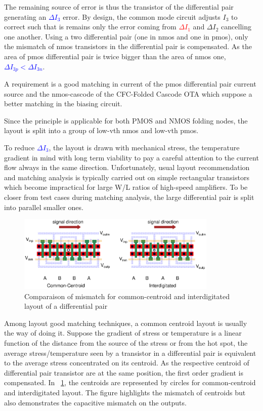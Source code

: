 The remaining source of error is thus the transistor of the differential pair generating an \textcolor{blue}{\(\Delta I_3\)} error. By design, the common mode circuit adjusts \(I_3\) to correct such that is remains only the error coming from \textcolor{red}{\(\Delta I_1\)} and \textcolor{Xgreen}{\(\Delta I_2\)} cancelling one another. Using a two differential pair (one in nmos and one in pmos), only the mismatch of nmos transistors in the differential pair is compensated. As the area of pmos differential pair is twice bigger than the area of nmos one, \textcolor{blue}{\(\Delta I_{3p} < \Delta I_{3n}\)}.

A requirement is a good matching in current of the pmos differential pair current source and the nmos-cascode of the CFC-Folded Cascode OTA which suppose a better matching in the biasing circuit.

Since the principle is applicable for both PMOS and NMOS folding nodes, the layout is split into a group of low-vth nmos and low-vth pmos.

To reduce \textcolor{blue}{\(\Delta I_3\)}, the layout is drawn with mechanical stress, the temperature gradient in mind with long term viability to pay a careful attention to the current flow always in the same direction. Unfortunately, usual layout recommendation and matching analysis is typically carried out on simple rectangular transistors which become impractical for large W/L ratios of high-speed amplifiers. To be closer from test cases during matching analysis, the large differential pair is split into parallel smaller ones.

\begin{figure}[htp]
    \centering
    \includegraphics[width=0.85\textwidth]{Chapter7/Figs/common-centroi-vs-interdigitated.ps}
    \caption{Comparaison of mismatch for common-centroid and interdigitated layout of a differential pair}
    \label{fig:common-centroid-vs-interdigitated}
\end{figure}

Among layout good matching techniques, a common centroid layout is usually the way of doing it. Suppose the gradient of stress or temperature is a linear function of the distance from the source of the stress or from the hot spot, the average stress/temperature seen by a transistor in a differential pair is equivalent to the average stress concentrated on its centroid. As the respective centroid of differential pair transistor are at the same position, the first order gradient is compensated. In \figurename~\ref{fig:common-centroid-vs-interdigitated}, the centroids are represented by circles for common-centroid and interdigitated layout.
The figure highlights the mismatch of centroids but also demonstrates the capacitive mismatch on the outputs.

